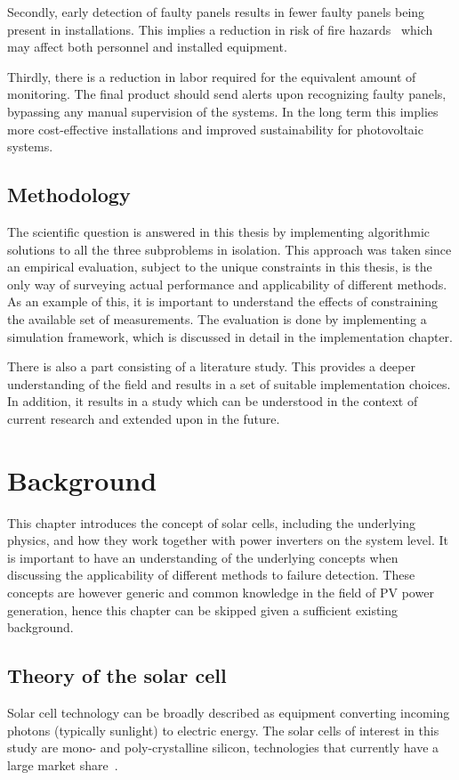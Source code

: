 Secondly, early detection of faulty panels results in fewer faulty panels being present in installations.
This implies a reduction in risk of fire hazards~\cite{Zhao2010night} which may affect both personnel and installed equipment.

Thirdly, there is a reduction in labor required for the equivalent amount of monitoring.
The final product should send alerts upon recognizing faulty panels, bypassing any manual supervision of the systems.
In the long term this implies more cost-effective installations and improved sustainability for photovoltaic systems.

\section{Methodology}
The scientific question is answered in this thesis by implementing algorithmic solutions to all the three subproblems in isolation.
This approach was taken since an empirical evaluation, subject to the unique constraints in this thesis, is the only way of surveying actual performance and applicability of different methods.
As an example of this, it is important to understand the effects of constraining the available set of measurements.
The evaluation is done by implementing a simulation framework, which is discussed in detail in the implementation chapter.

There is also a part consisting of a literature study.
This provides a deeper understanding of the field and results in a set of suitable implementation choices.
In addition, it results in a study which can be understood in the context of current research and extended upon in the future.

\chapter{Background}
This chapter introduces the concept of solar cells, including the underlying physics,
and how they work together with power inverters on the system level.
It is important to have an understanding of the underlying concepts when discussing the applicability of different methods to failure detection.
These concepts are however generic and common knowledge in the field of PV power generation, 
hence this chapter can be skipped given a sufficient existing background.

\section{Theory of the solar cell}
Solar cell technology can be broadly described as equipment converting incoming photons (typically sunlight) to electric energy.
The solar cells of interest in this study are mono- and poly-crystalline silicon, technologies that currently have a large market share~\cite{Zhao2010thesis}.


